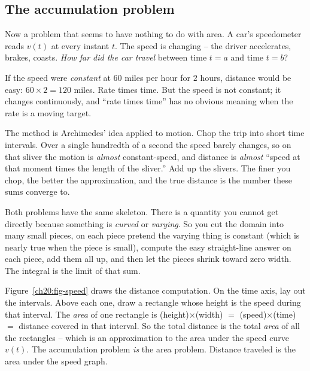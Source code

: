 \subsection{The accumulation problem}

Now a problem that seems to have nothing to do with area. A car's speedometer
reads $v(t)$ at every instant $t$. The speed is changing -- the driver
accelerates, brakes, coasts. \emph{How far did the car travel} between time
$t=a$ and time $t=b$?

If the speed were \emph{constant} at $60$ miles per hour for $2$ hours, distance
would be easy: $60 \times 2 = 120$ miles. Rate times time. But the speed is not
constant; it changes continuously, and ``rate times time'' has no obvious
meaning when the rate is a moving target.

The method is Archimedes' idea applied to motion.
Chop the trip into short time intervals. Over a
single hundredth of a second the speed barely changes, so on that sliver the
motion is \emph{almost} constant-speed, and distance is \emph{almost}
``speed at that moment times the length of the sliver.'' Add up the slivers. The
finer you chop, the better the approximation, and the true distance is the
number these sums converge to.

\begin{intuitionbox}
Both problems have the same skeleton. There is a quantity you cannot get
directly because something is \emph{curved} or \emph{varying}. So you cut the
domain into many small pieces, on each piece pretend the varying thing is
constant (which is nearly true when the piece is small), compute the easy
straight-line answer on each piece, add them all up, and then let the pieces
shrink toward zero width. The integral is the limit of that sum.
\end{intuitionbox}

Figure~\ref{ch20:fig-speed} draws the distance computation. On the time axis, lay out the
intervals. Above each one, draw a rectangle whose height is the speed during
that interval. The \emph{area} of one rectangle is (height)$\times$(width)
$=$ (speed)$\times$(time) $=$ distance covered in that interval. So the total
distance is the total \emph{area} of all the rectangles -- which is an
approximation to the area under the speed curve $v(t)$. The accumulation problem
\emph{is} the area problem. Distance traveled is the area under the speed graph.

